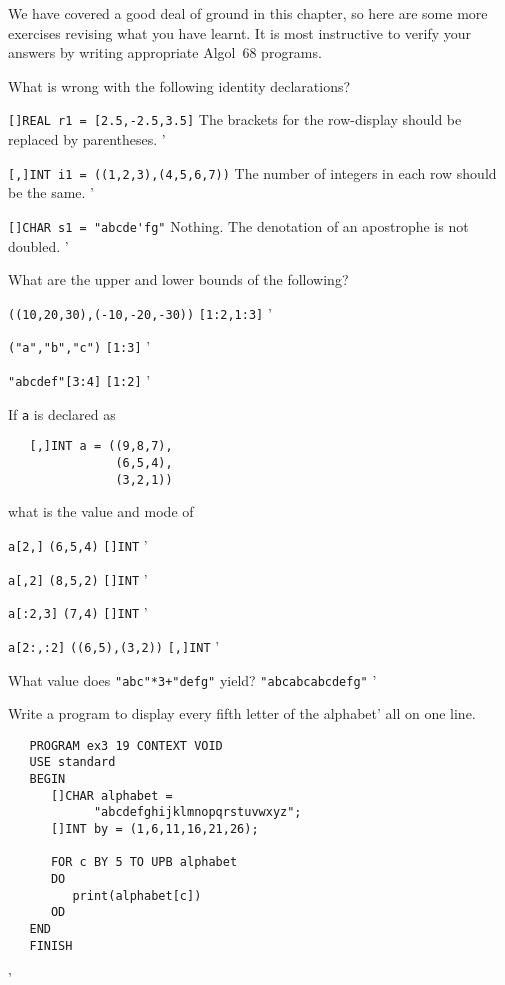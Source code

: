 We have covered a good deal of ground in this chapter, so here are
some more exercises revising what you have learnt.  It is most
instructive to verify your answers by writing appropriate Algol~68
programs.
\newpage
\begin{exercise}
\item What is wrong with the following identity declarations?
\begin{subex}
\item \verb|[]REAL r1 = [2.5,-2.5,3.5]| \subans The brackets for the
row-display should be replaced by parentheses.
'
\item \verb|[,]INT i1 = ((1,2,3),(4,5,6,7))| \subans The number of
integers in each row should be the same.
'
\item \verb|[]CHAR s1 = "abcde'fg"| \subans Nothing. The denotation
of an apostrophe is not doubled.
'
\end{subex}
\item What are the upper and lower bounds of the following?
\begin{subex}
\item \verb|((10,20,30),(-10,-20,-30))| \subans \verb|[1:2,1:3]|
'
\item \verb|("a","b","c")| \subans \verb|[1:3]|
'
\item \verb|"abcdef"[3:4]| \subans \verb|[1:2]|
'
\end{subex}
\item If \verb|a| is declared as
\begin{verbatim}
   [,]INT a = ((9,8,7),
               (6,5,4),
               (3,2,1))
\end{verbatim}
\noindent
what is the value and mode of
\begin{subex}
\item \verb|a[2,]| \subans \verb|(6,5,4)| \verb|[]INT|
'
\item \verb|a[,2]| \subans \verb|(8,5,2)| \verb|[]INT|
'
\item \verb|a[:2,3]| \subans \verb|(7,4)| \verb|[]INT|
'
\item \verb|a[2:,:2]| \subans \verb|((6,5),(3,2))| \verb|[,]INT|
'
\end{subex}
\item What value does \verb|"abc"*3+"defg"| yield?
\ans \verb|"abcabcabcdefg"|
'
\item Write a program to display every fifth letter of the alphabet'
all on one line. \ans \ %
\begin{verbatim}
   PROGRAM ex3 19 CONTEXT VOID
   USE standard
   BEGIN
      []CHAR alphabet =
            "abcdefghijklmnopqrstuvwxyz";
      []INT by = (1,6,11,16,21,26);

      FOR c BY 5 TO UPB alphabet
      DO
         print(alphabet[c])
      OD
   END
   FINISH
\end{verbatim}
'
\end{exercise}
